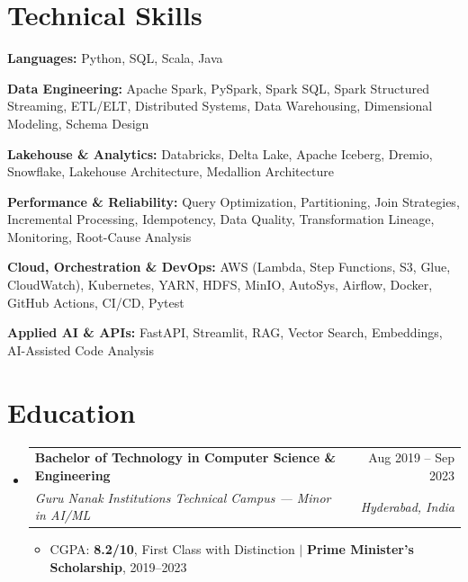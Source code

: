\documentclass[a4paper,10pt]{article}
\makeatletter
\newcommand{\resumeItem}[1]{\item\small{#1}}
\newcommand{\resumeSubheading}[4]{
  \item
  \begin{tabular*}{0.99\textwidth}[t]{l@{\extracolsep{\fill}}r}
    \textbf{#1} & #2 \\
    \textit{\small #3} & \textit{\small #4}
  \end{tabular*}\vspace{-6pt}
}
\newcommand{\resumeSubHeadingListStart}{
  \begin{itemize}[leftmargin=0.06in,label={},itemsep=3pt,topsep=2pt]
}
\newcommand{\resumeSubHeadingListEnd}{\end{itemize}}
\newcommand{\resumeItemListStart}{
  \begin{itemize}[leftmargin=0.18in,itemsep=0pt,topsep=1pt,parsep=0pt,partopsep=0pt]
}
\newcommand{\resumeItemListEnd}{\end{itemize}\vspace{-4pt}}
\makeatother
\begin{document}
\section{Technical Skills}
\begin{itemize}[leftmargin=0.06in,label={},itemsep=0.5pt,topsep=2pt]
  \small{
    \item \textbf{Languages:} Python, SQL, Scala, Java
    \item \textbf{Data Engineering:} Apache Spark, PySpark, Spark SQL, Spark Structured Streaming, ETL/ELT, Distributed Systems, Data Warehousing, Dimensional Modeling, Schema Design
    \item \textbf{Lakehouse \& Analytics:} Databricks, Delta Lake, Apache Iceberg, Dremio, Snowflake, Lakehouse Architecture, Medallion Architecture
    \item \textbf{Performance \& Reliability:} Query Optimization, Partitioning, Join Strategies, Incremental Processing, Idempotency, Data Quality, Transformation Lineage, Monitoring, Root-Cause Analysis
    \item \textbf{Cloud, Orchestration \& DevOps:} AWS (Lambda, Step Functions, S3, Glue, CloudWatch), Kubernetes, YARN, HDFS, MinIO, AutoSys, Airflow, Docker, GitHub Actions, CI/CD, Pytest
    \item \textbf{Applied AI \& APIs:} FastAPI, Streamlit, RAG, Vector Search, Embeddings, AI-Assisted Code Analysis
  }
\end{itemize}

\section{Education}
\resumeSubHeadingListStart
  \resumeSubheading
    {Bachelor of Technology in Computer Science \& Engineering}{Aug 2019 -- Sep 2023}
    {Guru Nanak Institutions Technical Campus --- Minor in AI/ML}{Hyderabad, India}

  \resumeItemListStart
    \resumeItem{CGPA: \textbf{8.2/10}, First Class with Distinction $|$ \textbf{Prime Minister's Scholarship}, 2019--2023}
  \resumeItemListEnd
\resumeSubHeadingListEnd
\end{document}
